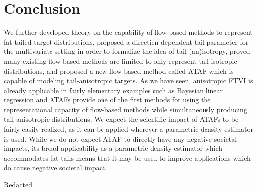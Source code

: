 \documentclass{article}
\theoremstyle{definition}
\theoremstyle{remark}
\begin{document}






\section{Conclusion}
\label{sec:conclusion}

We further developed theory on the capability of flow-based methods to represent fat-tailed
target distributions, proposed a direction-dependent tail parameter for the multivariate setting
in order to formalize the idea of tail-(an)isotropy, proved many existing flow-based methods are limited to only represent tail-isotropic distributions, and proposed a new flow-based method called
ATAF which is capable of modeling tail-anisotropic targets.
As we have seen, anisotropic FTVI is already applicable in fairly elementary examples such as Bayesian linear regression
and ATAFs provide one of the first methods for using the representational capacity of flow-based methods
while simultaneously producing tail-anisotropic distributions. We expect the scientific impact of ATAFs to be
fairly easily realized, as it can be applied wherever a parametric density estimator is used.
While we do not expect ATAF to directly have any negative societal impacts,
its broad applicability as a parametric density estimator which accommodates fat-tails means that it may be
used to improve applications which do cause negative societal impact.


\begin{ack}
  Redacted
\end{ack}
\end{document}
